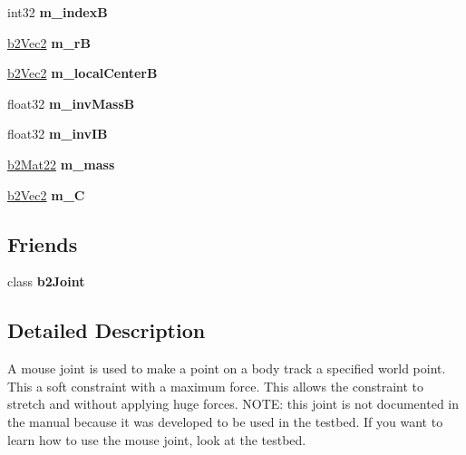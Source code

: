 \begin{DoxyCompactItemize}
\item 
\hypertarget{classb2_mouse_joint_a5b2c7802674942419c89f140c7db85b3}{int32 {\bfseries m\-\_\-index\-B}}\label{classb2_mouse_joint_a5b2c7802674942419c89f140c7db85b3}

\item 
\hypertarget{classb2_mouse_joint_a00510096c1433e6d7e671cf5bbb1c118}{\hyperlink{structb2_vec2}{b2\-Vec2} {\bfseries m\-\_\-r\-B}}\label{classb2_mouse_joint_a00510096c1433e6d7e671cf5bbb1c118}

\item 
\hypertarget{classb2_mouse_joint_ad9947876df55f4b4e7d435941234e22e}{\hyperlink{structb2_vec2}{b2\-Vec2} {\bfseries m\-\_\-local\-Center\-B}}\label{classb2_mouse_joint_ad9947876df55f4b4e7d435941234e22e}

\item 
\hypertarget{classb2_mouse_joint_a84c405322a35b0f2649071cdcd7be0fb}{float32 {\bfseries m\-\_\-inv\-Mass\-B}}\label{classb2_mouse_joint_a84c405322a35b0f2649071cdcd7be0fb}

\item 
\hypertarget{classb2_mouse_joint_a0a4959ae588d0071d97424e36f15228e}{float32 {\bfseries m\-\_\-inv\-I\-B}}\label{classb2_mouse_joint_a0a4959ae588d0071d97424e36f15228e}

\item 
\hypertarget{classb2_mouse_joint_a628b7a7a2cd2b50313daea30baf47c4e}{\hyperlink{structb2_mat22}{b2\-Mat22} {\bfseries m\-\_\-mass}}\label{classb2_mouse_joint_a628b7a7a2cd2b50313daea30baf47c4e}

\item 
\hypertarget{classb2_mouse_joint_a7ea02e17cdde70717e84bf44614275fb}{\hyperlink{structb2_vec2}{b2\-Vec2} {\bfseries m\-\_\-\-C}}\label{classb2_mouse_joint_a7ea02e17cdde70717e84bf44614275fb}

\end{DoxyCompactItemize}
\subsection*{Friends}
\begin{DoxyCompactItemize}
\item 
\hypertarget{classb2_mouse_joint_a54ade8ed3d794298108d7f4c4e4793fa}{class {\bfseries b2\-Joint}}\label{classb2_mouse_joint_a54ade8ed3d794298108d7f4c4e4793fa}

\end{DoxyCompactItemize}


\subsection{Detailed Description}
A mouse joint is used to make a point on a body track a specified world point. This a soft constraint with a maximum force. This allows the constraint to stretch and without applying huge forces. N\-O\-T\-E\-: this joint is not documented in the manual because it was developed to be used in the testbed. If you want to learn how to use the mouse joint, look at the testbed. 

